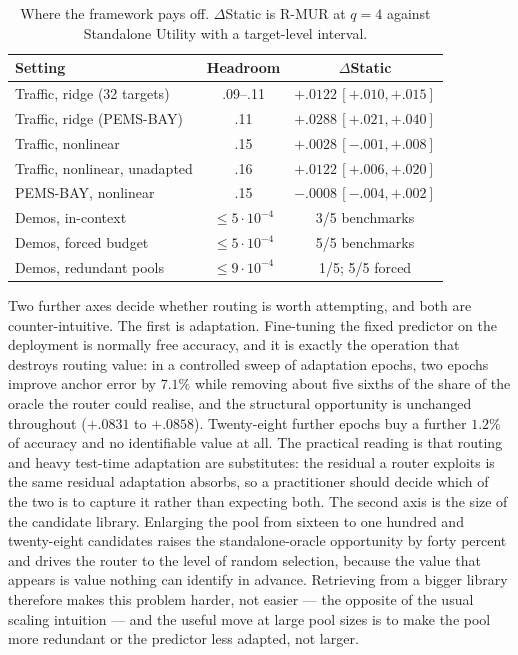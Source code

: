 \begin{table}[t]
 \centering
 \footnotesize
 \caption{Where the framework pays off. $\Delta$Static is R-MUR at $q=4$
 against Standalone Utility with a target-level interval.}
 \label{tab:boundary}
 \begin{tabular}{lcc}
  \toprule
  Setting & Headroom & $\Delta$Static\\
  \midrule
  Traffic, ridge (32 targets) & .09--.11 & $+.0122\,[+.010,+.015]$\\
  Traffic, ridge (PEMS-BAY) & .11 & $+.0288\,[+.021,+.040]$\\
  Traffic, nonlinear & .15 & $+.0028\,[-.001,+.008]$\\
  Traffic, nonlinear, unadapted & .16 & $+.0122\,[+.006,+.020]$\\
  PEMS-BAY, nonlinear & .15 & $-.0008\,[-.004,+.002]$\\
  Demos, in-context & $\le 5\cdot10^{-4}$ & 3/5 benchmarks\\
  Demos, forced budget & $\le 5\cdot10^{-4}$ & 5/5 benchmarks\\
  Demos, redundant pools & $\le 9\cdot10^{-4}$ & 1/5; 5/5 forced\\
  \bottomrule
 \end{tabular}
\end{table}

Two further axes decide whether routing is worth attempting, and both are
counter-intuitive. The first is adaptation. Fine-tuning the fixed predictor on
the deployment is normally free accuracy, and it is exactly the operation that
destroys routing value: in a controlled sweep of adaptation epochs, two epochs
improve anchor error by $7.1\%$ while removing about five sixths of the share
of the oracle the router could realise, and the structural opportunity is
unchanged throughout ($+.0831$ to $+.0858$). Twenty-eight further epochs buy a
further $1.2\%$ of accuracy and no identifiable value at all. The practical
reading is that routing and heavy test-time adaptation are substitutes: the
residual a router exploits is the same residual adaptation absorbs, so a
practitioner should decide which of the two is to capture it rather than
expecting both. The second axis is the size of the candidate library. Enlarging
the pool from sixteen to one hundred and twenty-eight candidates raises the
standalone-oracle opportunity by forty percent and drives the router to the
level of random selection, because the value that appears is value nothing can
identify in advance. Retrieving from a bigger library therefore makes this
problem harder, not easier --- the opposite of the usual scaling intuition ---
and the useful move at large pool sizes is to make the pool more redundant or
the predictor less adapted, not larger.

